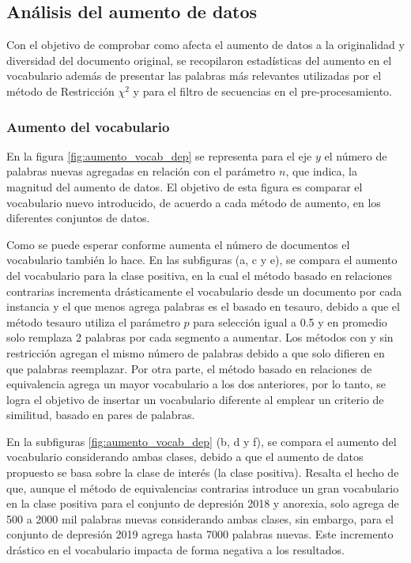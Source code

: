 \subsection{Análisis del aumento de datos}
Con el objetivo de comprobar como afecta el aumento de datos a la originalidad y diversidad del documento original, se recopilaron estadísticas del aumento en el vocabulario además de presentar las palabras más relevantes utilizadas por el método de Restricción $\chi^2$ y para el filtro de secuencias en el pre-procesamiento.

\subsubsection{Aumento del vocabulario}

En la figura \ref{fig:aumento_vocab_dep} se representa para el eje $y$ el número de palabras nuevas agregadas en relación con el parámetro $n$, que indica, la magnitud del aumento de datos. El objetivo de esta figura es comparar el vocabulario nuevo introducido, de acuerdo a cada método de aumento, en los diferentes conjuntos de datos.

Como se puede esperar conforme aumenta el número de documentos el vocabulario también lo hace. En las subfiguras (a, c y e), se compara el aumento del vocabulario para la clase positiva, en la cual el método basado en relaciones contrarias incrementa drásticamente el vocabulario desde un documento por cada instancia y el que menos agrega palabras es el basado en tesauro, debido a que el método tesauro utiliza el parámetro $p$ para selección igual a 0.5 y en promedio solo remplaza 2 palabras por cada segmento a aumentar. Los métodos con y sin restricción agregan el mismo número de palabras debido a que solo difieren en que palabras reemplazar. Por otra parte, el método basado en relaciones de equivalencia agrega un mayor vocabulario a los dos anteriores, por lo tanto, se logra el objetivo de insertar un vocabulario diferente al emplear un criterio de similitud, basado en pares de palabras.

En la subfiguras \ref{fig:aumento_vocab_dep} (b, d y f), se compara el aumento del vocabulario considerando ambas clases, debido a que el aumento de datos propuesto se basa sobre la clase de interés (la clase positiva). Resalta el hecho de que, aunque el método de equivalencias contrarias introduce un gran vocabulario en la clase positiva para el conjunto de depresión 2018 y anorexia, solo agrega de 500 a 2000 mil palabras nuevas considerando ambas clases, sin embargo, para el conjunto de depresión 2019 agrega hasta 7000 palabras nuevas. Este incremento drástico en el vocabulario impacta de forma negativa a los resultados. 


